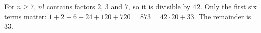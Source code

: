 For $n\ge7$, $n!$ contains factors $2$, $3$ and $7$, so it is divisible by $42$. Only the first six terms matter: $1+2+6+24+120+720=873=42\cdot20+33$. The remainder is $\boxed{33}$.
